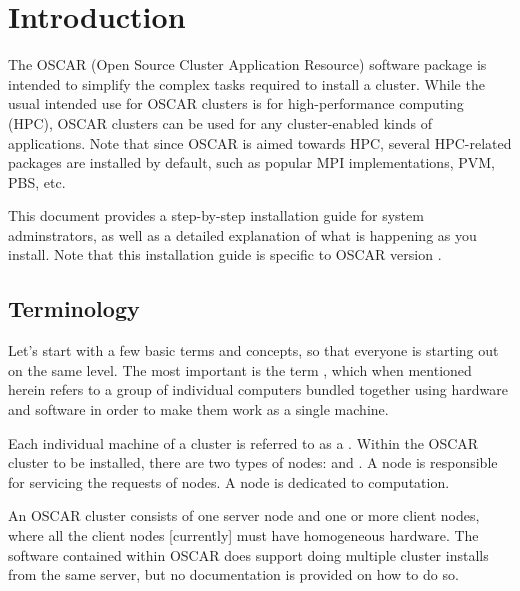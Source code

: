 %
%
%

\section{Introduction}

The OSCAR (Open Source Cluster Application Resource) software package
is intended to simplify the complex tasks required to install a
cluster.  While the usual intended use for OSCAR clusters is for
high-performance computing (HPC), OSCAR clusters can be used for any
cluster-enabled kinds of applications.  Note that since OSCAR is aimed
towards HPC, several HPC-related packages are installed by default,
such as popular MPI implementations, PVM, PBS, etc.

This document provides a step-by-step installation guide for system
adminstrators, as well as a detailed explanation of what is happening
as you install.  Note that this installation guide is specific to
OSCAR version \oscarversion.  


\subsection{Terminology}

Let's start with a few basic terms and concepts, so that everyone is
starting out on the same level. The most important is the term
, which when mentioned herein refers to a group of
individual computers bundled together using hardware and software in
order to make them work as a single machine. 

Each individual machine of a cluster is referred to as a .
Within the OSCAR cluster to be installed, there are two types of
nodes:  and . A  node is
responsible for servicing the requests of  nodes.  A
 node is dedicated to computation.  

An OSCAR cluster consists of one server node and one or more client
nodes, where all the client nodes [currently] must have homogeneous
hardware.  The software contained within OSCAR does support doing
multiple cluster installs from the same server, but no documentation
is provided on how to do so.


